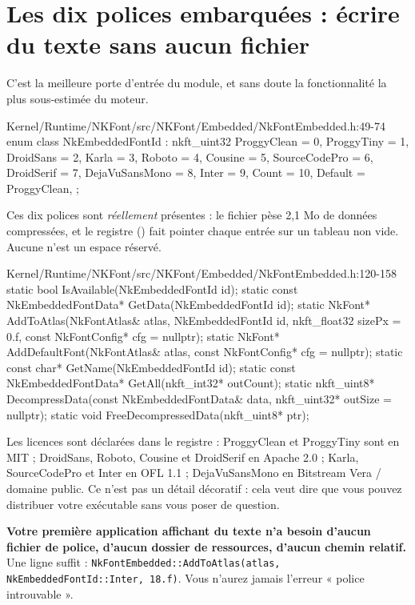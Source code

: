 \section{Les dix polices embarquées : écrire du texte sans aucun fichier}

C'est la meilleure porte d'entrée du module, et sans doute la fonctionnalité la
plus sous-estimée du moteur.

\begin{nkcode}{Kernel/Runtime/NKFont/src/NKFont/Embedded/NkFontEmbedded.h:49-74}
enum class NkEmbeddedFontId : nkft_uint32 {
    ProggyClean = 0, ProggyTiny = 1, DroidSans = 2, Karla = 3, Roboto = 4,
    Cousine = 5, SourceCodePro = 6, DroidSerif = 7, DejaVuSansMono = 8, Inter = 9,
    Count = 10, Default = ProggyClean,
};
\end{nkcode}

Ces dix polices sont \emph{réellement} présentes : le fichier
 pèse 2,1 Mo de données compressées, et le
registre () fait pointer chaque entrée sur
un tableau non vide. Aucune n'est un espace réservé.

\begin{nkcode}{Kernel/Runtime/NKFont/src/NKFont/Embedded/NkFontEmbedded.h:120-158}
static bool IsAvailable(NkEmbeddedFontId id);
static const NkEmbeddedFontData* GetData(NkEmbeddedFontId id);
static NkFont* AddToAtlas(NkFontAtlas& atlas, NkEmbeddedFontId id,
                          nkft_float32 sizePx = 0.f, const NkFontConfig* cfg = nullptr);
static NkFont* AddDefaultFont(NkFontAtlas& atlas, const NkFontConfig* cfg = nullptr);
static const char* GetName(NkEmbeddedFontId id);
static const NkEmbeddedFontData* GetAll(nkft_int32* outCount);
static nkft_uint8* DecompressData(const NkEmbeddedFontData& data, nkft_uint32* outSize = nullptr);
static void FreeDecompressedData(nkft_uint8* ptr);
\end{nkcode}

Les licences sont déclarées dans le registre : ProggyClean et ProggyTiny sont en
MIT ; DroidSans, Roboto, Cousine et DroidSerif en Apache 2.0 ; Karla,
SourceCodePro et Inter en OFL 1.1 ; DejaVuSansMono en Bitstream Vera / domaine
public. Ce n'est pas un détail décoratif : cela veut dire que vous pouvez
distribuer votre exécutable sans vous poser de question.

\begin{nkretenir}
\textbf{Votre première application affichant du texte n'a besoin d'aucun fichier
de police, d'aucun dossier de ressources, d'aucun chemin relatif.} Une ligne
suffit :
\texttt{NkFontEmbedded::AddToAtlas(atlas, NkEmbeddedFontId::Inter, 18.f)}.
Vous n'aurez jamais l'erreur « police introuvable ».
\end{nkretenir}

